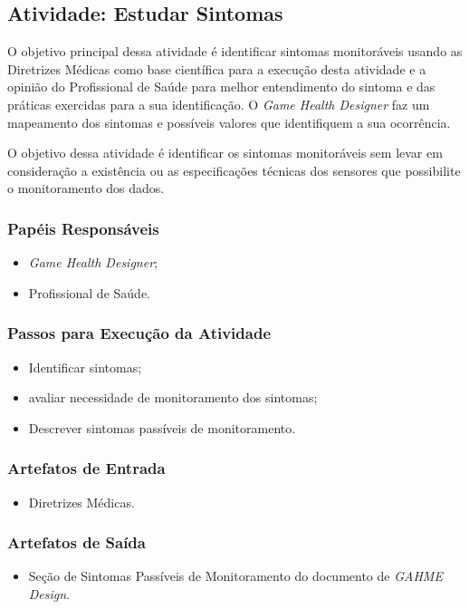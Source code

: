 \subsection{Atividade: Estudar Sintomas}
O objetivo principal dessa atividade é identificar sintomas monitoráveis usando as Diretrizes Médicas como base científica para a execução desta atividade e a opinião do Profissional de Saúde para melhor entendimento do sintoma e das práticas exercidas para a sua identificação. O \textit{Game Health Designer} faz um mapeamento dos sintomas e possíveis valores que identifiquem a sua ocorrência. 

O objetivo dessa atividade é identificar os sintomas monitoráveis sem levar em consideração a existência ou as especificações técnicas dos sensores que possibilite o monitoramento dos dados. 

\subsubsection{Papéis Responsáveis}
\begin{itemize}
	\item \textit{Game Health Designer};
	\item Profissional de Saúde.
\end{itemize}

\subsubsection{Passos para Execução da Atividade}
\begin{itemize}
	\item Identificar sintomas;
	\item avaliar necessidade de monitoramento dos sintomas;
	\item Descrever sintomas passíveis de monitoramento.
\end{itemize}

\subsubsection{Artefatos de Entrada}
\begin{itemize}
	\item Diretrizes Médicas.
\end{itemize}

\subsubsection{Artefatos de Saída}
\begin{itemize}
	\item Seção de Sintomas Passíveis de Monitoramento do documento de \textit{GAHME Design}.
\end{itemize}

